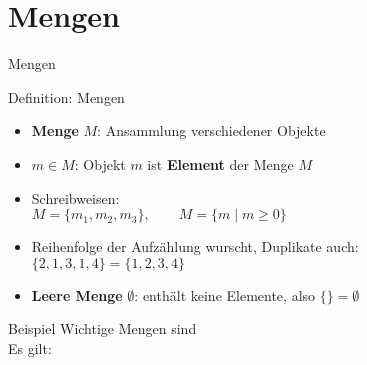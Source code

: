 \section{Mengen}

\morescalingdelimiters

\begin{frame}{Mengen}
	\pause %
	\begin{block}{Definition: Mengen} \vspace{-.5\baselineskip}
		\begin{itemize}
			\item \textbf{Menge} $M$: Ansammlung verschiedener Objekte
			\item $m \in M$: Objekt $m$ ist \textbf{Element} der Menge $M$
			\item Schreibweisen: \\
			$M = \{m_1, m_2, m_3 \}, \qquad M = \{m \mid m \geq 0\}$
			\item Reihenfolge der Aufzählung wurscht, Duplikate auch: \\
			$\{2,1,3,1,4\} = \{1,2,3,4\}$
			\item \textbf{Leere Menge} $\emptyset$: enthält keine Elemente, \quad also $\{\} = \emptyset$
		\end{itemize}
	\end{block}
	\pause
	
	\begin{block}{Beispiel}
		Wichtige Mengen sind \\ 
		Es gilt:\\ 
	\end{block}
	
\end{frame}

